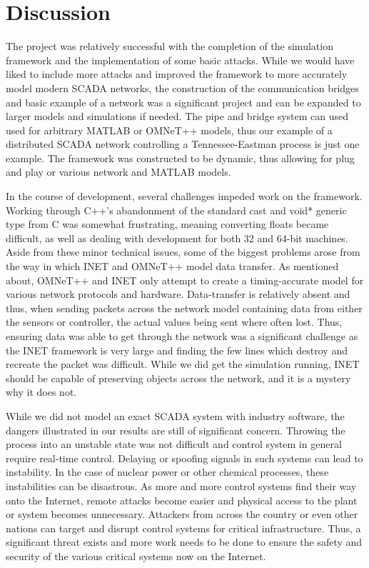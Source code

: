 \section{Discussion}

The project was relatively successful with the completion of the simulation framework and the implementation of some basic attacks. While we would have liked to include more attacks and improved the framework to more accurately model modern SCADA networks, the construction of the communication bridges and basic example of a network was a significant project and can be expanded to larger models and simulations if needed. The pipe and bridge system can used used for arbitrary MATLAB or OMNeT++ models, thus our example of a distributed SCADA network controlling a Tennessee-Eastman process is just one example. The framework was constructed to be dynamic, thus allowing for plug and play or various network and MATLAB models.

In the course of development, several challenges impeded work on the framework. Working through C++'s abandonment of the standard cast and void* generic type from C was somewhat frustrating, meaning converting floats became difficult, as well as dealing with development for both 32 and 64-bit machines. Aside from these minor technical issues, some of the biggest problems arose from the way in which INET and OMNeT++ model data transfer. As mentioned about, OMNeT++ and INET only attempt to create a timing-accurate model for various network protocols and hardware. Data-transfer is relatively absent and thus, when sending packets across the network model containing data from either the sensors or controller, the actual values being sent where often lost. Thus, ensuring data was able to get through the network was a significant challenge as the INET framework is very large and finding the few lines which destroy and recreate the packet was difficult. While we did get the simulation running, INET should be capable of preserving objects across the network, and it is a mystery why it does not.

While we did not model an exact SCADA system with industry software, the dangers illustrated in our results are still of significant concern. Throwing the process into an unstable state was not difficult and control system in general require real-time control. Delaying or spoofing signals in such systems can lead to instability. In the case of nuclear power or other chemical processes, these instabilities can be disastrous. As more and more control systems find their way onto the Internet, remote attacks become easier and physical access to the plant or system becomes unnecessary. Attackers from across the country or even other nations can target and disrupt control systems for critical infrastructure. Thus, a significant threat exists and more work needs to be done to ensure the safety and security of the various critical systems now on the Internet.